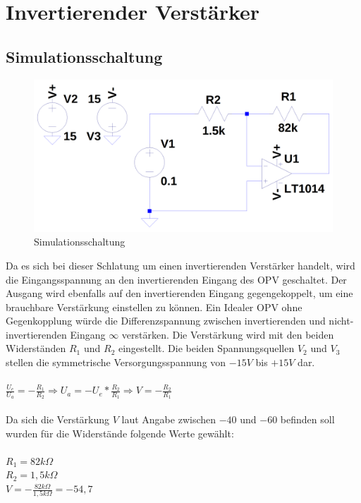 
\section{Invertierender Verst\"arker}
\subsection{Simulationsschaltung}
\begin{figure}[H]
  \begin{center}
    \includegraphics[width=1\textwidth]{./Schaltungen/InvertierenderVerstaerker.png}
    \caption{Simulationsschaltung}
  \end{center}
\end{figure}
\noindent
Da es sich bei dieser Schlatung um einen invertierenden Verst\"arker handelt, wird die Eingangsspannung an den invertierenden Eingang des OPV geschaltet.
Der Ausgang wird ebenfalls auf den invertierenden Eingang gegengekoppelt, um eine brauchbare Verst\"arkung einstellen zu k\"onnen. Ein Idealer OPV ohne Gegenkopplung w\"urde die Differenzspannung zwischen invertierenden und nicht-invertierenden Eingang $\infty$ verst\"arken. Die Verst\"arkung wird mit den beiden Widerst\"anden $R_1$
und $R_2$ eingestellt. Die beiden Spannungsquellen $V_2$ und $V_3$ stellen die symmetrische Versorgungsspannung von $-15V$ bis $+15V$ dar.\\ \\
$\frac{U_e}{U_a}=-\frac{R_1}{R_2} \Rightarrow U_a=-U_e*\frac{R_2}{R_1} \Rightarrow V=-\frac{R_2}{R_1}$ \\ \\
Da sich die Verst\"arkung $V$ laut Angabe zwischen $-40$ und $-60$ befinden soll wurden f\"ur die Widerst\"ande folgende Werte gew\"ahlt: \\ \\
$R_1=82k\Omega$ \\
$R_2=1,5k\Omega$ \\
$V=-\frac{82k \Omega}{1,5k\Omega}=-54,7$

